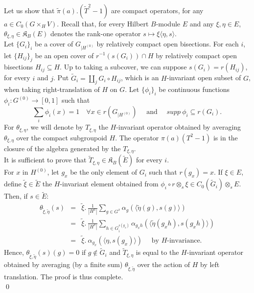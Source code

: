 \begin{dem}
Let us show that $\tilde\pi(a). (\tilde T^2-1)$ are compact operators, for any $a\in C_0(G\times_H V)$. Recall that, for every Hilbert $B$-module $E$ and any $\xi,\eta\in E$, $\theta_{\xi,\eta}\in\mathfrak K_B(E)$ denotes the rank-one operator $s\mapsto \xi \langle \eta,s\rangle$.\\ 

Let $\{G_i\}_i$ be a cover of $G_{|H^{(0)}}$ by relatively compact open bisections. For each $i$, let $\{H_{ij}\}_j$ be an open cover of $r^{-1}( s(G_i))\cap H$ by relatively compact open bisections $H_{ij} \subseteq H$. Up to taking a subcover, we can suppose $s(G_i) = r(H_{ij})$, for every $i$ and $j$. Put $\tilde G_i = \coprod_j G_i \circ H_{ij}$, which is an $H$-invariant open subset of $G$, when taking right-translation of $H$ on $G$. Let $\{\phi_i\}_i$ be continuous functions $\phi_i : G^{(0)}\rightarrow [0,1]$ such that 
\[\sum_{i} \phi_i(x) = 1\quad \forall x\in r(G_{|H^{(0)}}) \quad \text{ and } \quad supp \ \phi_i\subseteq r(G_i) .\] 
For $\theta_{\xi,\eta}$, we will denote by $T_{\xi,\eta}$ the $H$-invariant operator obtained by averaging $\theta_{\xi,\eta}$ over the compact subgroupoid $H$. The operator $\pi(a)(T^2-1)$ is in the closure of the algebra generated by the $T_{\xi, \eta}$.\\%

It is sufficient to prove that $\tilde T_{\xi,\eta} \in \mathfrak K_B(\tilde E)$ for every $i$.\\

For $x$ in $H^{(0)}$, let $g_x$ be the only element of $G_i$ such that $r(g_x)= x$. If $\xi \in E$, define $\tilde \xi\in \tilde E$ the $H$-invariant element obtained from $\phi_i \circ r \otimes_s \xi \in C_0(\tilde G_i)\otimes_s E$. Then, if $s\in \tilde E$: 
\[\begin{array}{rcl}
\theta_{\tilde \xi,\tilde \eta}(s) 	& = & \tilde \xi .\ \frac{1}{|H^x|} \sum_{g\in G^x} \alpha_g (\langle \tilde\eta (g), s(g) \rangle) \\
					& = & \tilde \xi .\ \frac{1}{|H^x|} \sum_{h\in G_i^{s(g_x)} } \alpha_{g_x h} (\langle \tilde\eta (g_x h), s(g_x h) \rangle) \\
					& = & \tilde \xi .\  \alpha_{g_x} (\langle \eta, s(g_x) \rangle)  \quad \text{ by $H$-invariance.	}
\end{array}\]
Hence, $\theta_{\tilde \xi,\tilde \eta}(s)(g) = 0$ if $g\notin \tilde G_i$ and $\tilde T_{\xi,\eta} $ is equal to the $H$-invariant operator obtained by averaging (by a finite sum) $ \theta_{\tilde\xi,\tilde\eta}$ over the action of $H$ by left translation. The proof is thus complete.\\
\qed 
\end{dem}

